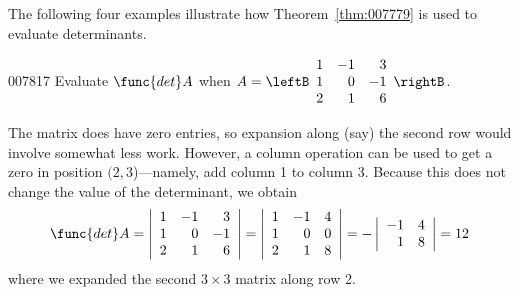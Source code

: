 \medskip

The following four examples illustrate how Theorem~\ref{thm:007779} is used to evaluate determinants.

\begin{example}{}{007817}
Evaluate $\func{det } A$ when 
$A = \leftB \begin{array}{rrr}
1 & -1 & 3 \\
1 & 0 & -1 \\
2 & 1 & 6 
\end{array}
\rightB$.

\begin{solution}
 The matrix does have zero entries, so expansion along (say) the second 
row would involve somewhat less work. However, a column operation can be
 used to get a zero in position $(2, 3$)---namely, add column 1 to column 3.
 Because this does not change the value of the determinant, we obtain
\begin{equation*}
\func{det } A = \left| \begin{array}{rrr}
1 & -1 & 3 \\
1 & 0 & -1 \\
2 & 1 & 6 
\end{array} \right| =  \left| \begin{array}{rrr}
1 & -1 & 4 \\
1 & 0 & 0 \\
2 & 1 & 8 
\end{array} \right|
= - \left| \begin{array}{rr}
-1 & 4 \\
1 & 8 
\end{array} \right|
=12
\end{equation*}
where we expanded the second $3 \times 3$ matrix along row 2.
\end{solution}
\end{example}


